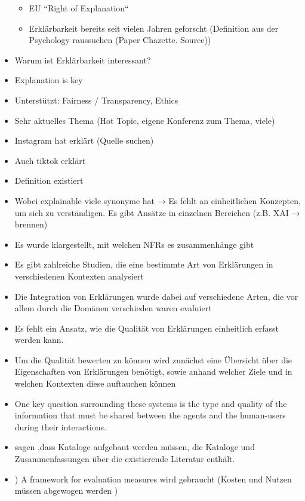 \begin{itemize}
\begin{itemize}
        \item EU “Right of Explanation“
        \item Erklärbarkeit bereits seit vielen Jahren geforscht (Definition aus der Psychology raussuchen (Paper Chazette. Source))
    \end{itemize}
    \item Warum ist Erklärbarkeit interessant?
    \item Explanation is key \cite{jaimes2007guest}
    \item Unterstützt: Fairness / Transparency, Ethics
    \item Sehr aktuelles Thema (Hot Topic, eigene Konferenz zum Thema, viele)
    \item Instagram hat erklärt (Quelle suchen)
    \item Auch tiktok erklärt
    \item Definition existiert
    \item Wobei explainable viele synonyme hat → Es fehlt an einheitlichen Konzepten, um sich zu verständigen. Es gibt Ansätze in einzelnen Bereichen (z.B. XAI → brennen)
    \item Es wurde klargestellt, mit welchen NFRs es zusammenhänge gibt
    \item Es gibt zahlreiche Studien, die eine bestimmte Art von Erklärungen in verschiedenen Kontexten analysiert
    \item Die Integration von Erklärungen wurde dabei auf verschiedene Arten, die vor allem durch die Domänen verschieden waren evaluiert
    \item Es fehlt ein Ansatz, wie die Qualität von Erklärungen einheitlich erfasst werden kann.
    \item Um die Qualität bewerten zu können  wird zunächst eine Übersicht über die Eigenschaften von Erklärungen benötigt, sowie anhand welcher Ziele und in welchen Kontexten diese auftauchen können
    \item One key question surrounding these systems is the type and quality of the information that must be shared between the agents and the human-users during their interactions. \cite{rosenfeld_explainability_2019}
    \item \cite{kohl_explainability_2019, chung2009non} sagen ,dass Kataloge aufgebaut werden müssen, die Kataloge und Zusammenfassungen über die existierende Literatur enthält.
    \item \cite{cassens_ambient_2019}) A framework for evaluation measures wird gebraucht (Kosten und Nutzen müssen abgewogen werden \cite{chazette_end-users_nodate})

\end{itemize}
